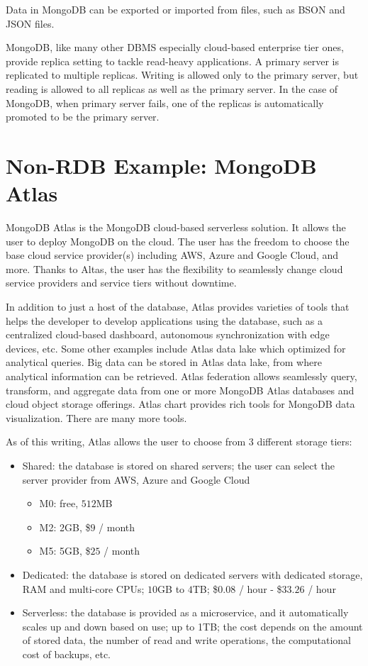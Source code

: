 Data in MongoDB can be exported or imported from files, such as BSON and JSON files.

MongoDB, like many other DBMS especially cloud-based enterprise tier ones, provide replica setting to tackle read-heavy applications. A primary server is replicated to multiple replicas. Writing is allowed only to the primary server, but reading is allowed to all replicas as well as the primary server. In the case of MongoDB, when primary server fails, one of the replicas is automatically promoted to be the primary server.

\section{Non-RDB Example: MongoDB Atlas}

MongoDB Atlas is the MongoDB cloud-based serverless solution. It allows the user to deploy MongoDB on the cloud. The user has the freedom to choose the base cloud service provider(s) including AWS, Azure and Google Cloud, and more. Thanks to Altas, the user has the flexibility to seamlessly change cloud service providers and service tiers without downtime. 

In addition to just a host of the database, Atlas provides varieties of tools that helps the developer to develop applications using the database, such as a centralized cloud-based dashboard, autonomous synchronization with edge devices, etc. Some other examples include Atlas data lake which optimized for analytical queries. Big data can be stored in Atlas data lake, from where analytical information can be retrieved. Atlas federation allows seamlessly query, transform, and aggregate data from one or more MongoDB Atlas databases and cloud object storage offerings. Atlas chart provides rich tools for MongoDB data visualization. There are many more tools.

As of this writing, Atlas allows the user to choose from 3 different storage tiers:
\begin{itemize}
  \item Shared: the database is stored on shared servers; the user can select the server provider from AWS, Azure and Google Cloud
  \begin{itemize}
    \item M0: free, $512$MB
    \item M2: 2GB, \$$9$ / month
    \item M5: 5GB, \$$25$ / month
  \end{itemize}
  \item Dedicated: the database is stored on dedicated servers with dedicated storage, RAM and multi-core CPUs; $10$GB to $4$TB; \$$0.08$ / hour - \$$33.26$ / hour
  \item Serverless: the database is provided as a microservice, and it automatically scales up and down based on use; up to 1TB; the cost depends on the amount of stored data, the number of read and write operations, the computational cost of backups, etc.
\end{itemize}

